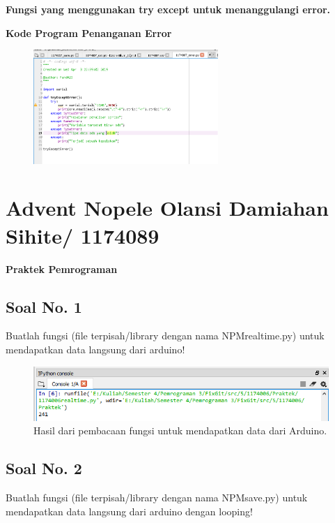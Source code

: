 \textbf{Fungsi yang menggunakan try except untuk menanggulangi error.}



\textbf{Kode Program Penanganan Error}
\begin{figure}[ht]
	\includegraphics[width=7cm]{figures/5/1174087/Praktek/1174087_error.png}
	\centering
\end{figure}
\section{Advent Nopele Olansi Damiahan Sihite/ 1174089}
{\Large \textbf{Praktek Pemrograman}}
\subsection{Soal No. 1}
Buatlah  fungsi  (file  terpisah/library  dengan  nama  NPMrealtime.py)  untuk mendapatkan data langsung dari arduino!


\begin{figure}[H]
	\includegraphics[width=12cm]{figures/5/1174089/Praktek/1.png}
	\centering
	\caption{Hasil dari pembacaan fungsi untuk mendapatkan data dari Arduino.}
\end{figure}

\subsection{Soal No. 2}
Buatlah fungsi (file terpisah/library dengan nama NPMsave.py) untuk mendapatkan data langsung dari arduino dengan looping!


